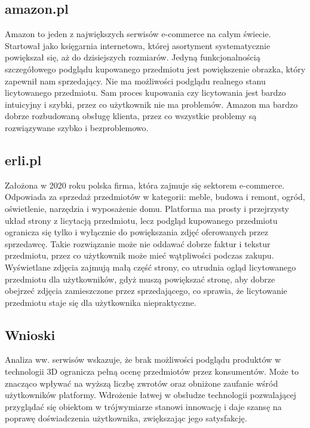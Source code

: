 \subsection{amazon.pl}
Amazon to jeden z największych serwisów e-commerce na całym świecie. Startował jako księgarnia internetowa, której asortyment systematycznie powiększał się, aż do dzisiejszych rozmiarów. Jedyną funkcjonalnością szczegółowego podglądu kupowanego przedmiotu jest powiększenie obrazka, który zapewnił nam sprzedający. Nie ma możliwości podglądu realnego stanu licytowanego przedmiotu. Sam proces kupowania czy licytowania jest bardzo intuicyjny i szybki, przez co użytkownik nie ma problemów. Amazon ma bardzo dobrze rozbudowaną obsługę klienta, przez co wszystkie problemy są rozwiązywane szybko i bezproblemowo.


\subsection{erli.pl}
Założona w 2020 roku polska firma, która zajmuje się sektorem e-commerce. Odpowiada za sprzedaż przedmiotów w kategorii: meble, budowa i remont, ogród, oświetlenie, narzędzia i wyposażenie domu. Platforma ma prosty i przejrzysty układ strony z licytacją przedmiotu, lecz podgląd kupowanego przedmiotu ogranicza się tylko i wyłącznie do powiększania zdjęć oferowanych przez sprzedawcę. Takie rozwiązanie może nie oddawać dobrze faktur i tekstur przedmiotu, przez co użytkownik może mieć wątpliwości podczas zakupu. Wyświetlane zdjęcia zajmują małą część strony, co utrudnia ogląd licytowanego przedmiotu dla użytkowników, gdyż muszą powiększać stronę, aby dobrze obejrzeć zdjęcia zamieszczone przez sprzedającego, co sprawia, że licytowanie przedmiotu staje się dla użytkownika niepraktyczne.

\subsection{Wnioski}
Analiza ww. serwisów wskazuje, że brak możliwości podglądu produktów w technologii 3D ogranicza pełną ocenę przedmiotów przez konsumentów. Może to znacząco wpływać na wyższą liczbę zwrotów oraz obniżone zaufanie wśród użytkowników platformy. Wdrożenie łatwej w obsłudze technologii pozwalającej przyglądać się obiektom w trójwymiarze stanowi innowację i daje szansę na poprawę doświadczenia użytkownika, zwiększając jego satysfakcję.



